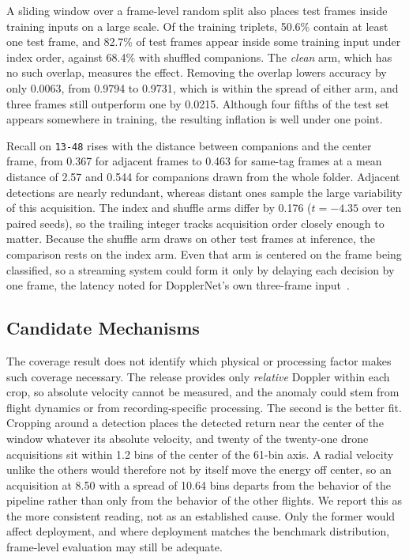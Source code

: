 \documentclass{ICIC2026}
\begin{document}
A sliding window over a frame-level random split also places test frames inside training inputs on a large scale. Of the training triplets, 50.6\% contain at least one test frame, and 82.7\% of test frames appear inside some training input under index order, against 68.4\% with shuffled companions. The \emph{clean} arm, which has no such overlap, measures the effect. Removing the overlap lowers accuracy by only 0.0063, from 0.9794 to 0.9731, which is within the spread of either arm, and three frames still outperform one by 0.0215. Although four fifths of the test set appears somewhere in training, the resulting inflation is well under one point.

Recall on \texttt{13-48} rises with the distance between companions and the center frame, from 0.367 for adjacent frames to 0.463 for same-tag frames at a mean distance of 2.57 and 0.544 for companions drawn from the whole folder. Adjacent detections are nearly redundant, whereas distant ones sample the large variability of this acquisition. The index and shuffle arms differ by 0.176 ($t=-4.35$ over ten paired seeds), so the trailing integer tracks acquisition order closely enough to matter. Because the shuffle arm draws on other test frames at inference, the comparison rests on the index arm. Even that arm is centered on the frame being classified, so a streaming system could form it only by delaying each decision by one frame, the latency noted for DopplerNet's own three-frame input~\cite{roldan2020}.

\subsection{Candidate Mechanisms}
\label{sec:discussion}

The coverage result does not identify which physical or processing factor makes such coverage necessary. The release provides only \emph{relative} Doppler within each crop, so absolute velocity cannot be measured, and the anomaly could stem from flight dynamics or from recording-specific processing. The second is the better fit. Cropping around a detection places the detected return near the center of the window whatever its absolute velocity, and twenty of the twenty-one drone acquisitions sit within 1.2 bins of the center of the 61-bin axis. A radial velocity unlike the others would therefore not by itself move the energy off center, so an acquisition at 8.50 with a spread of 10.64 bins departs from the behavior of the pipeline rather than only from the behavior of the other flights. We report this as the more consistent reading, not as an established cause. Only the former would affect deployment, and where deployment matches the benchmark distribution, frame-level evaluation may still be adequate.
\end{document}
